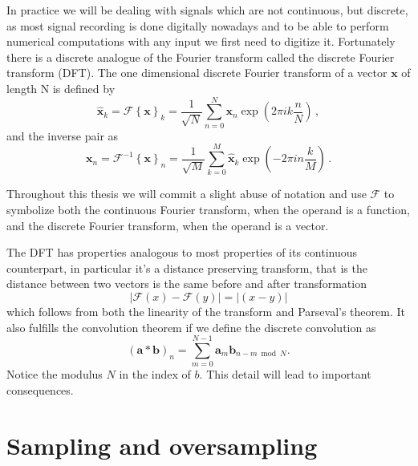 In practice we will be dealing with signals which are not continuous, but
discrete, as most signal recording is done digitally nowadays and to be able to
perform numerical computations with any input we first need to digitize
it. Fortunately there is a discrete analogue of the Fourier transform called
the discrete Fourier transform (DFT). The one dimensional discrete Fourier
transform of a vector $\mathbf x$ of length N is defined by
\begin{equation}
\hat{\mathbf x}_k = \mathscr{F}\left\{ \mathbf x\right\}_k = \frac{1}{\sqrt{N}} \sum
\limits_{n=0}^{N} \mathbf x_n \exp\left(2 \pi i k \frac{n}{N}\right) \, ,
\end{equation}
and the inverse pair as
\begin{equation}
{\mathbf x}_n = \mathscr{F}^{-1}\left\{ \mathbf x\right\}_n = \frac{1}{\sqrt{M}} \sum
\limits_{k=0}^{M} \hat{\mathbf x}_k \exp\left(-2 \pi i n \frac{k}{M}\right) \, .
\end{equation}

Throughout this thesis we will commit a slight abuse of notation and use
$\mathscr{F}$ to symbolize both the continuous Fourier transform, when the
operand is a function, and the discrete Fourier transform, when the operand is a
vector.
 
The DFT has properties analogous to most properties of its continuous
counterpart, in particular it's a distance preserving transform, that is the distance between two vectors is the same before and after transformation
\begin{equation}
  |\mathscr{F}(x)-\mathscr{F}(y)| = |(x-y)|
\end{equation}
which follows from both the linearity of the transform and Parseval's theorem.
It also fulfills the convolution theorem if we define the discrete
convolution as
\begin{equation}
  (\mathbf a * \mathbf b)_n = \sum \limits_{m = 0}^{N-1} \mathbf a_m 
  \mathbf  b_{n-m \bmod N} .
  \label{Eq:dft_convolution}
\end{equation}
Notice the modulus $N$ in the index of $b$. This detail will lead to important
consequences.

\section{Sampling and oversampling}


